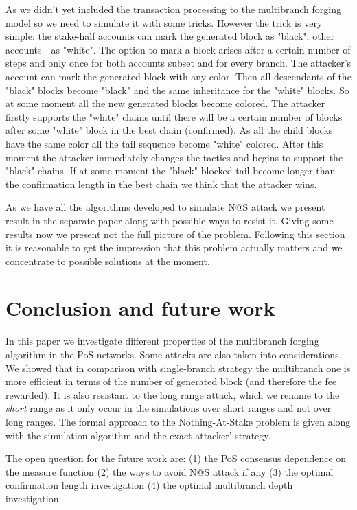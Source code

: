 \documentclass[12pt]{article}
\begin{document}
As we didn't yet included the transaction processing to the multibranch forging model so we need to simulate it with some tricks. However the trick is very simple:
the stake-half accounts can mark the generated block as "black", other accounts \-- as "white". 
The option to mark a block arises after a certain number of steps and only once for both accounts subset and for every branch. The attacker's account 
can mark the generated block with any color. Then all descendants of the "black" blocks become "black" and the same inheritance for the "white" blocks. So at 
some moment all the new generated blocks become colored. The attacker firstly supports the "white" chains until there  will be a certain number of blocks 
after some "white" block in the best chain (confirmed). As all the child blocks have the same color all the tail sequence become "white" colored. 
After this moment the 
attacker immediately changes the tactics and begins to support the "black" chains. If at some moment the "black"-blocked tail become longer than the confirmation 
length in the best chain we think that the attacker wins.        

As we have all the algorithms developed to simulate N@S attack we present result in the separate paper along with possible ways to resist it. Giving some results
now we present not the full picture of the problem. Following this section it is reasonable to get the impression that this problem actually matters and 
we concentrate to possible solutions at the moment. 

\section{Conclusion and future work}
In this paper we investigate different properties of the multibranch forging algorithm in the PoS networks. Some attacks are also taken into considerations.
We showed that in comparison with single-branch strategy the multibranch one is more efficient in terms of the number of generated block (and therefore 
the fee rewarded). It is also resistant to the long range attack, which we rename to the {\it short} range as it only occur in the simulations
over short ranges and not over long ranges. The formal approach to the Nothing-At-Stake problem is given along with the simulation algorithm and 
the exact attacker' strategy.

The open question for the future work are: (1) the PoS consensus dependence on the measure function (2) the ways to avoid N@S attack if any 
(3) the optimal confirmation length investigation (4) the optimal multibranch depth investigation.     
\end{document}
